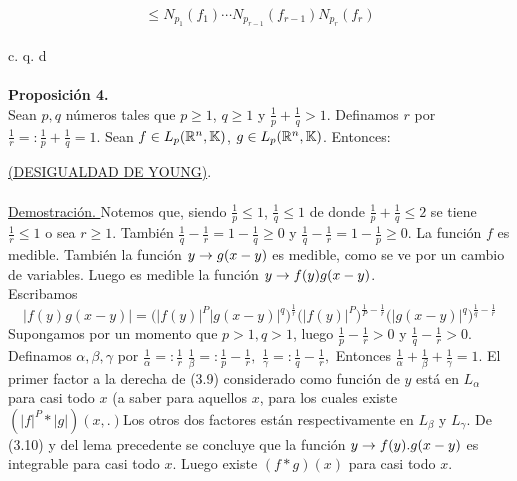  $$
  \leq N_{p_1}(f_1) \cdots N_{p_{r-1}}(f_{r-1})N_{p_r}(f_r)
 $$\\
  \phantom{sssssssssssssssssssssssssssssssssss sasdasdasdasdadadssada} c. q. d \\ \\

\textbf{Proposición 4.} \\
Sean $p,q$ números tales que $p \geq 1$, $q \geq 1$ y $\frac{1}{p} + \frac{1}{q} >1$. Definamos $r$ por $\frac{1}{r}=: \frac{1}{p} + \frac{1}{q}=1$. Sean $f \in L_p (\mathbb{R}^n, \mathbb{K})$, $g \in L_p (\mathbb{R}^n, \mathbb{K})$. Entonces: 
\underline{(DESIGUALDAD DE YOUNG)}. \\ \\
\underline{Demostración. }
Notemos que, siendo $\frac{1}{p} \leq 1$, $\frac{1}{q} \leq 1$ de donde $\frac{1}{p}+\frac{1}{q} \leq 2$ se tiene $\frac{1}{r} \leq 1$ o sea $r \geq 1$. También $\frac{1}{q}-\frac{1}{r}=1-\frac{1}{q} \geq 0$ y $\frac{1}{q}-\frac{1}{r}=1-\frac{1}{p} \geq 0$. La función $f$ es medible. También la función $y \rightarrow g(x-y)$ es medible, como se ve por un cambio de variables. Luego es medible la función $y \rightarrow f(y) g(x-y)$.  \\
Escribamos 
\begin{equation}
|f(y) g(x-y)|=\biggl( |f(y)|^{P} |g(x-y)|^q \biggr)^\frac{1}{r}  \biggl(|f(y)|^P \biggr)^{\frac{1}{P}-\frac{1}{r}} \biggl( |g(x-y)|^q  \biggr)^{\frac{1}{q}-\frac{1}{r}}
\end{equation}
Supongamos por un momento que $p>1, q>1$, luego $\frac{1}{p}-\frac{1}{r}>0$ y $\frac{1}{q}-\frac{1}{r}>0$.\\
Definamos $\alpha, \beta, \gamma$ por $\frac{1}{\alpha}=:\frac{1}{r}$ $\frac{1}{\beta}=:\frac{1}{p}-\frac{1}{r},$ $\frac{1}{\gamma}=:\frac{1}{q}-\frac{1}{r},$
Entonces $\frac{1}{\alpha}+\frac{1}{\beta}+\frac{1}{\gamma}=1$. El primer factor a la derecha de (3.9) considerado como función de $y$ está en $L_{\alpha}$ para casi todo $x$ (a saber para aquellos $x$, para los cuales existe $(|f|^P * |g|)(x,.)$Los otros dos factores están respectivamente en $L_{\beta}$ y $L_{\gamma}$. De (3.10) y del lema precedente se concluye que la función $y \rightarrow f(y).g(x-y)$ es integrable para casi todo $x$. Luego existe $(f*g)(x)$ para casi todo $x$. 
